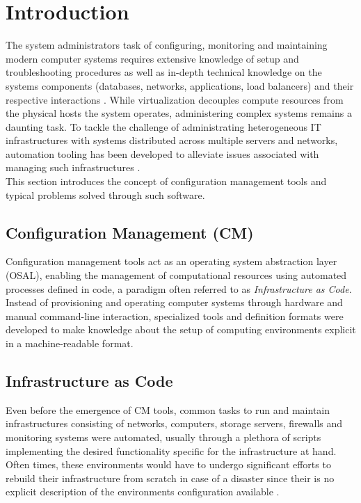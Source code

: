 \section{Introduction}

	The system administrators task of configuring, monitoring and maintaining modern computer systems requires extensive knowledge of setup and troubleshooting procedures as well as in-depth technical knowledge on the systems components (databases, networks, applications, load balancers) and their respective interactions \cite{Barrett:2004:FSC:1031607.1031672}. While virtualization decouples compute resources from the physical hosts the system operates, administering complex systems remains a daunting task. To tackle the challenge of administrating heterogeneous IT infrastructures with systems distributed across multiple servers and networks, automation tooling has been developed to alleviate issues associated with managing such infrastructures \cite{Hintsch2016ARO}. \\ This section introduces the concept of configuration management tools and typical problems solved through such software.

\subsection{Configuration Management (CM)}

Configuration management tools act as an operating system abstraction layer (OSAL), enabling the management of computational resources using automated processes defined in code, a paradigm often referred to as \textit{Infrastructure as Code}. Instead of provisioning and operating computer systems through hardware and manual command-line interaction, specialized tools and definition formats were developed to make knowledge about the setup of computing environments explicit in a machine-readable format.

\subsection{Infrastructure as Code}

Even before the emergence of CM tools, common tasks to run and maintain infrastructures consisting of networks, computers, storage servers, firewalls and monitoring systems were automated, usually through a plethora of scripts implementing the desired functionality specific for the infrastructure at hand. Often times, these environments would have to undergo significant efforts to rebuild their infrastructure from scratch in case of a disaster since their is no explicit description of the environments configuration available \cite{Hüttermann2012}.

